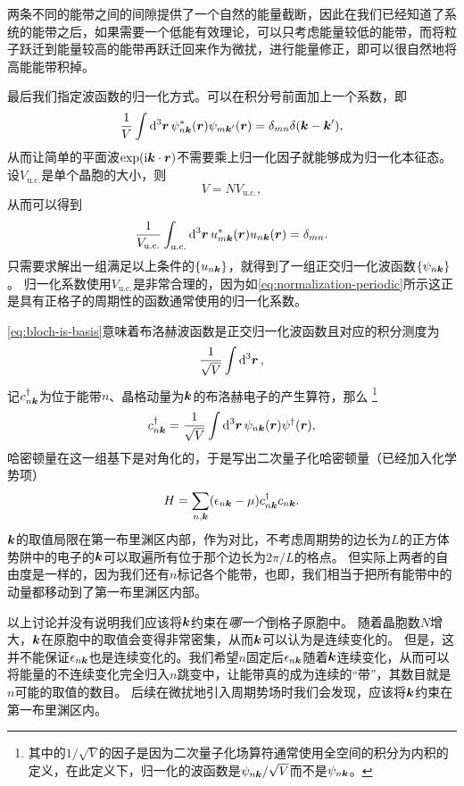 两条不同的能带之间的间隙提供了一个自然的能量截断，因此在我们已经知道了系统的能带之后，如果需要一个低能有效理论，可以只考虑能量较低的能带，而将粒子跃迁到能量较高的能带再跃迁回来作为微扰，进行能量修正，即可以很自然地将高能能带积掉。

最后我们指定波函数的归一化方式。可以在积分号前面加上一个系数，即
\begin{equation}
    \frac{1}{V} \int \dd[3]{\vb*{r}} \psi_{n\vb*{k}}^*(\vb*{r}) \psi_{m\vb*{k}'}(\vb*{r}) = \delta_{mn} \delta(\vb*{k}-\vb*{k}'),
    \label{eq:bloch-is-basis}
\end{equation}
从而让简单的平面波$\exp(\mathrm{i} \vb*{k} \cdot \vb*{r})$不需要乘上归一化因子就能够成为归一化本征态。
设$V_\text{u.c.}$是单个晶胞的大小，则
\[
    V = N V_\text{u.c.},
\]
从而可以得到
\begin{equation}
    \frac{1}{V_\text{u.c.}} \int_\text{u.c.} \dd[3]{\vb*{r}} u_{m\vb*{k}}^*(\vb*{r}) u_{n\vb*{k}}(\vb*{r}) = \delta_{mn}.
\end{equation}
只需要求解出一组满足以上条件的$\{u_{n\vb*{k}}\}$，就得到了一组正交归一化波函数$\{\psi_{n\vb*{k}}\}$。
归一化系数使用$V_\text{u.c.}$是非常合理的，因为如\eqref{eq:normalization-periodic}所示这正是具有正格子的周期性的函数通常使用的归一化系数。

\eqref{eq:bloch-is-basis}意味着布洛赫波函数是正交归一化波函数且对应的积分测度为
\[
    \frac{1}{\sqrt{V}} \int \dd[3]{\vb*{r}},
\]
记${c}_{n\vb*{k}}^\dagger$为位于能带$n$、晶格动量为$\vb*{k}$的布洛赫电子的产生算符，那么%
\footnote{其中的$1/\sqrt{V}$的因子是因为二次量子化场算符通常使用全空间的积分为内积的定义，在此定义下，归一化的波函数是$\psi_{n\vb*{k}} / \sqrt{V}$而不是$\psi_{n\vb*{k}}$。}%
\begin{equation}
    {c}_{n \vb*{k}}^\dagger = \frac{1}{\sqrt{V}} \int \dd[3]{\vb*{r}} \psi_{n \vb*{k}}(\vb*{r}) {\psi}^\dagger(\vb*{r}),
\end{equation}
哈密顿量在这一组基下是对角化的，于是写出二次量子化哈密顿量（已经加入化学势项）
\begin{equation}
    {H} = \sum_{n, \vb*{k}} (\epsilon_{n\vb*{k}} - \mu) {c}^\dagger_{n\vb*{k}} {c}_{n\vb*{k}}.
    \label{eq:bloch-band-hamiltonian}
\end{equation}
$\vb*{k}$的取值局限在第一布里渊区内部，作为对比，不考虑周期势的边长为$L$的正方体势阱中的电子的$\vb*{k}$可以取遍所有位于那个边长为$2\pi / L$的格点。
但实际上两者的自由度是一样的，因为我们还有$n$标记各个能带，也即，我们相当于把所有能带中的动量都移动到了第一布里渊区内部。

以上讨论并没有说明我们应该将$\vb*{k}$约束在\emph{哪一个}倒格子原胞中。
随着晶胞数$N$增大，$\vb*{k}$在原胞中的取值会变得非常密集，从而$\vb*{k}$可以认为是连续变化的。
但是，这并不能保证$\epsilon_{n \vb*{k}}$也是连续变化的。我们希望$n$固定后$\epsilon_{n \vb*{k}}$随着$\vb*{k}$连续变化，从而可以将能量的不连续变化完全归入$n$跳变中，让能带真的成为连续的“带”，其数目就是$n$可能的取值的数目。
后续在微扰地引入周期势场时我们会发现，应该将$\vb*{k}$约束在第一布里渊区内。

